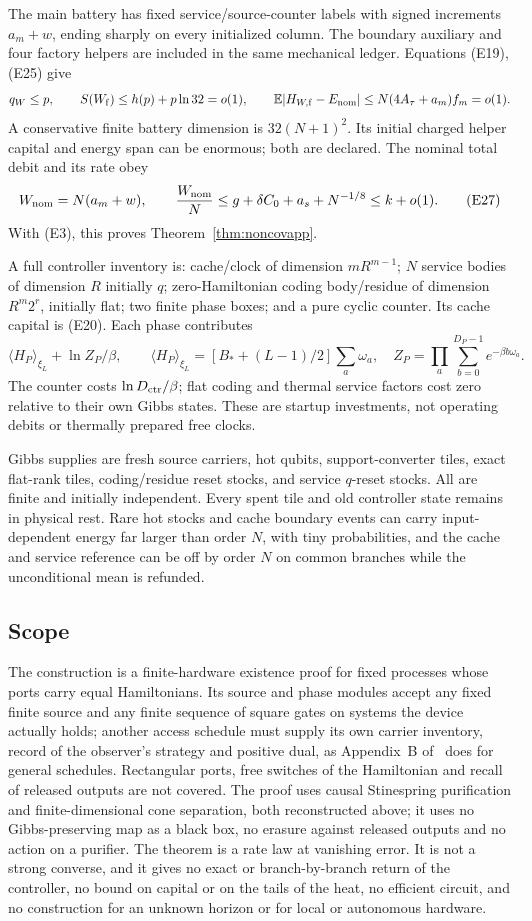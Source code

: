 \documentclass[11pt]{article}
\theoremstyle{definition}
\theoremstyle{remark}
\begin{document}
The main battery has fixed service/source-counter labels with signed
increments \(a_m+w\), ending sharply on every initialized column.
The boundary auxiliary and four factory helpers are included in
the same mechanical ledger. Equations (E19), (E25) give
\[
 q_W\le p,\qquad S(W_{\rm f})\le h(p)+p\ln32=o(1),\qquad
 \mathbb E|H_{W,\rm f}-E_{\rm nom}|\le N(4A_\tau+a_m) f_m=o(1).
\]
A conservative finite battery dimension is \(32(N+1)^2\).
Its initial charged helper capital and energy span can be enormous;
both are declared. The nominal total debit and its rate obey
\[
 W_{\rm nom}=N(a_m+w),\qquad
 \frac{W_{\rm nom}}N
 \le g+\delta C_0+a_s+N^{-1/8}\le k+o(1).           \tag{E27}
\]
With (E3), this proves Theorem~\ref{thm:noncovapp}.

A full controller inventory is: cache/clock of dimension \(mR^{m-1}\);
\(N\) service bodies of dimension \(R\) initially \(q\);
zero-Hamiltonian coding body/residue of dimension \(R^m2^r\), initially flat;
two finite phase boxes; and a pure cyclic counter.
Its cache capital is (E20). Each phase contributes
\[
 \langle H_P\rangle_{\xi_L}+\ln Z_P/\beta,\qquad
 \langle H_P\rangle_{\xi_L}
 =[B_*+(L-1)/2]\sum_a\omega_a,\quad
 Z_P=\prod_a\sum_{b=0}^{D_P-1}e^{-\beta b\omega_a}.
\]
The counter costs \(\ln D_{\rm ctr}/\beta\); flat coding and thermal
service factors cost zero relative to their own Gibbs states.
These are startup investments, not operating debits or thermally
prepared free clocks.

Gibbs supplies are fresh source carriers, hot qubits, support-converter
tiles, exact flat-rank tiles, coding/residue reset stocks, and service
\(q\)-reset stocks. All are finite and initially independent.
Every spent tile and old controller state remains in physical rest.
Rare hot stocks and cache boundary events can carry input-dependent energy far larger than order $N$, with tiny probabilities, and the cache and service reference can be off by order \(N\) on common
branches while the unconditional mean is refunded.

\subsection{Scope}
The construction is a finite-hardware existence proof for fixed processes whose ports carry equal Hamiltonians. Its source and phase modules accept any fixed finite source and any finite sequence of square gates on systems the device actually holds; another access schedule must supply its own carrier inventory, record of the observer's strategy and positive dual, as Appendix~B of~\cite{TimeOrder} does for general schedules. Rectangular ports, free switches of the Hamiltonian and recall of released outputs are not covered. The proof uses causal Stinespring purification and finite-dimensional cone separation, both reconstructed above; it uses no Gibbs-preserving map as a black box, no erasure against released outputs and no action on a purifier. The theorem is a rate law at vanishing error. It is not a strong converse, and it gives no exact or branch-by-branch return of the controller, no bound on capital or on the tails of the heat, no efficient circuit, and no construction for an unknown horizon or for local or autonomous hardware.
\end{document}
